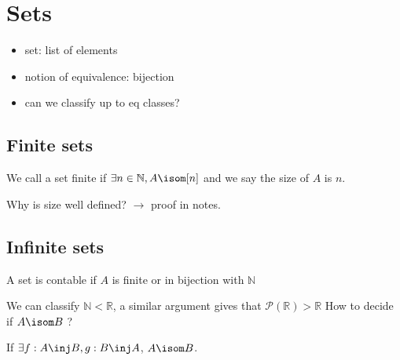 \documentclass[../main.tex]{subfiles}
\begin{document}
\section{Sets}
\begin{itemize}
\item set: list of elements
\item notion of equivalence: bijection
\item can we classify up to eq classes?
\end{itemize}
\subsection{Finite sets}
\begin{defn}
	We call a set finite if $\exists n \in \mathbb{N}, A \isom [ n] $ and we say the size of $A$ is $n$.
\end{defn}
Why is size well defined? $\to$ proof in notes.\\
\subsection{Infinite sets}
\begin{defn}
	A set is contable if $A$ is finite or in bijection with $\mathbb{N}$ 
\end{defn}
We can classify $\mathbb{N}< \mathbb{R}$, a similar argument gives that $\mathcal{P}( \mathbb{R}) > \mathbb{R}$ 
How to decide if $A \isom B$ ?
\begin{thm}
	If $\exists f: A \inj B, g: B\inj A$, $A\isom B$.
\end{thm}
\end{document}

